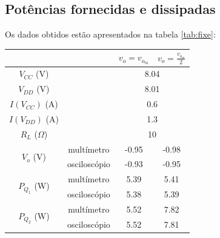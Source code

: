 \documentclass[%
  reprint,
  nofootinbib,
  amsmath,amssymb,
  aps,
  10pt,
  a4paper
]{revtex4-1}
\begin{document}
{\subsection{Potências fornecidas e dissipadas}
Os dados obtidos estão apresentados na tabela \ref{tab:fixe}:
\begin{table}[h]
\begin{tabular}{|cc|c|c|}
                                                             & \multicolumn{1}{l|}{} & $v_o=v_{o_m}$ & $v_o=\frac{v_{o_m}}{2}$ \\ \hline
$V_{CC}$ (V)                                                 & \multicolumn{1}{l|}{} & \multicolumn{2}{c|}{8.04}               \\ \hline
$V_{DD}$ (V)                                                 & \multicolumn{1}{l|}{} & \multicolumn{2}{c|}{8.01}               \\ \hline
$I(V_{CC})$ (A)                                              & \multicolumn{1}{l|}{} & \multicolumn{2}{c|}{0.6}                \\ \hline
$I(V_{DD})$ (A)                                              & \multicolumn{1}{l|}{} & \multicolumn{2}{c|}{1.3}                \\ \hline
$R_L$ ($\Omega$)                                             &                       & \multicolumn{2}{c|}{10}                 \\ \hline
\multicolumn{1}{|c|}{\multirow{2}{*}{$V_o$ (V)}}             & multímetro            & -0.95         & -0.98                   \\ \cline{2-4} 
\multicolumn{1}{|c|}{}                                       & osciloscópio          & -0.93         & -0.95                   \\ \hline
\multicolumn{1}{|c|}{\multirow{2}{*}{$P_{Q_1}$ (W)}}         & multímetro            & 5.39          & 5.41                    \\ \cline{2-4} 
\multicolumn{1}{|c|}{}                                       & osciloscópio          & 5.38          & 5.39                    \\ \hline
\multicolumn{1}{|c|}{\multirow{2}{*}{$P_{Q_2}$ (W)}}         & multímetro            & 5.52          & 7.82                    \\ \cline{2-4} 
\multicolumn{1}{|c|}{}                                       & osciloscópio          & 5.52          & 7.81                    \\ \hline

\end{tabular}
\end{table}}
\end{document}
